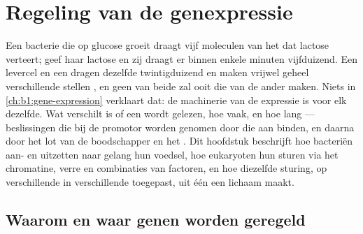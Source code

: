 \chapter{Regeling van de genexpressie}\label{ch:b1:expression-control}

Een bacterie die op glucose groeit draagt vijf moleculen van het  dat lactose
verteert; geef haar lactose en zij draagt er binnen enkele minuten vijfduizend. Een
levercel en een  dragen dezelfde twintigduizend  en maken vrijwel geheel
verschillende stellen , en geen van beide zal ooit die van de ander maken.
Niets in \cref{ch:b1:gene-expression} verklaart dat: de machinerie van de expressie
is voor elk  dezelfde. Wat verschilt is of een  wordt gelezen, hoe vaak, en
hoe lang --- beslissingen die bij de promotor worden genomen door  die aan
 binden, en daarna door het lot van de boodschapper en het . Dit hoofdstuk
beschrijft hoe bacteriën  aan- en uitzetten naar gelang hun voedsel, hoe
eukaryoten hun  sturen via het chromatine, verre  en combinaties van
factoren, en hoe diezelfde sturing, op verschillende  in verschillende 
toegepast, uit één  een lichaam maakt.

\section{Waarom en waar genen worden geregeld}


